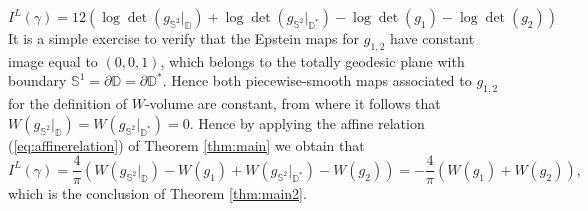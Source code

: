 \documentclass[12pt]{amsart}
\begin{document}
\begin{equation}
    I^L(\gamma) = 12(\log\det(g_{\mathbb{S}^2}|_{\mathbb{D}}) + \log\det(g_{\mathbb{S}^2}|_{\mathbb{D}^*})- \log\det(g_1)- \log\det(g_2)) 
\end{equation}
It is a simple exercise to verify that the Epstein maps for $g_{1,2}$ have constant image equal to $(0,0,1)$, which belongs to the totally geodesic plane with boundary $\mathbb{S}^1=\partial\mathbb{D}=\partial\mathbb{D^*}$. Hence both piecewise-smooth maps associated to $g_{1,2}$ for the definition of $W$-volume are constant, from where it follows that $W(g_{\mathbb{S}^2}|_{\mathbb{D}}) = W(g_{\mathbb{S}^2}|_{\mathbb{D}^*})=0$. Hence by applying the affine relation (\ref{eq:affinerelation}) of Theorem \ref{thm:main} we obtain that
\[ I^L(\gamma) = \frac{4}{\pi}(W(g_{\mathbb{S}^2}|_{\mathbb{D}}) - W(g_1) + W(g_{\mathbb{S}^2}|_{\mathbb{D}^*}) - W(g_2)) = -\frac{4}{\pi}(W(g_1)+W(g_2)),
\]
which is the conclusion of Theorem \ref{thm:main2}.



\end{document}

